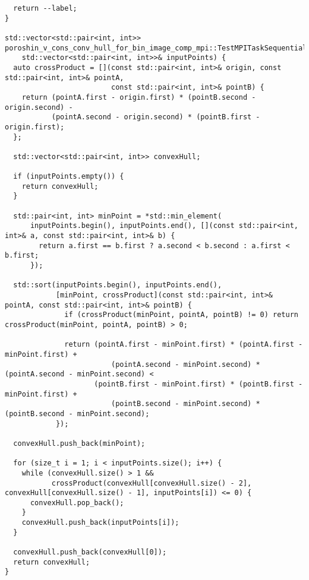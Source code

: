 \documentclass[12pt]{article}
\begin{document}
\begin{verbatim}
  return --label;
}

std::vector<std::pair<int, int>> poroshin_v_cons_conv_hull_for_bin_image_comp_mpi::TestMPITaskSequential::convex_hull(
    std::vector<std::pair<int, int>>& inputPoints) {
  auto crossProduct = [](const std::pair<int, int>& origin, const std::pair<int, int>& pointA,
                         const std::pair<int, int>& pointB) {
    return (pointA.first - origin.first) * (pointB.second - origin.second) -
           (pointA.second - origin.second) * (pointB.first - origin.first);
  };

  std::vector<std::pair<int, int>> convexHull;

  if (inputPoints.empty()) {
    return convexHull;
  }

  std::pair<int, int> minPoint = *std::min_element(
      inputPoints.begin(), inputPoints.end(), [](const std::pair<int, int>& a, const std::pair<int, int>& b) {
        return a.first == b.first ? a.second < b.second : a.first < b.first;
      });

  std::sort(inputPoints.begin(), inputPoints.end(),
            [minPoint, crossProduct](const std::pair<int, int>& pointA, const std::pair<int, int>& pointB) {
              if (crossProduct(minPoint, pointA, pointB) != 0) return crossProduct(minPoint, pointA, pointB) > 0;

              return (pointA.first - minPoint.first) * (pointA.first - minPoint.first) +
                         (pointA.second - minPoint.second) * (pointA.second - minPoint.second) <
                     (pointB.first - minPoint.first) * (pointB.first - minPoint.first) +
                         (pointB.second - minPoint.second) * (pointB.second - minPoint.second);
            });

  convexHull.push_back(minPoint);

  for (size_t i = 1; i < inputPoints.size(); i++) {
    while (convexHull.size() > 1 &&
           crossProduct(convexHull[convexHull.size() - 2], convexHull[convexHull.size() - 1], inputPoints[i]) <= 0) {
      convexHull.pop_back();
    }
    convexHull.push_back(inputPoints[i]);
  }

  convexHull.push_back(convexHull[0]);
  return convexHull;
}
\end{verbatim}
\end{document}
